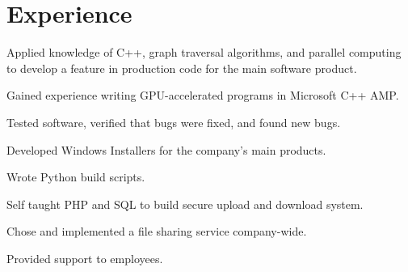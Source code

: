 \documentclass[letterpaper]{deedy-resume} %
\begin{document}
\begin{minipage}[t]{0.66\textwidth} %


\section{Experience}


\vspace{\topsep} %
\begin{tightitemize}
\item Applied knowledge of C++, graph traversal algorithms, and parallel
  computing to develop a feature in production code for the main software
  product.
\item Gained experience writing GPU-accelerated programs in Microsoft C++ AMP.
\item Tested software, verified that bugs were fixed, and found new bugs.
\item Developed Windows Installers for the company's main products.
\item Wrote Python build scripts.
\end{tightitemize}

\sectionspace %



\begin{tightitemize}
\item Self taught PHP and SQL to build secure upload and download system.
\item Chose and implemented a file sharing service company-wide.
\item Provided support to employees.
\end{tightitemize}

\sectionspace %



\end{minipage}
\end{document}
